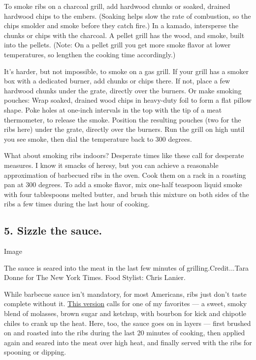 To smoke ribs on a charcoal grill, add hardwood chunks or soaked,
drained hardwood chips to the embers. (Soaking helps slow the rate of
combustion, so the chips smolder and smoke before they catch fire.) In a
kamado, intersperse the chunks or chips with the charcoal. A pellet
grill has the wood, and smoke, built into the pellets. (Note: On a
pellet grill you get more smoke flavor at lower temperatures, so
lengthen the cooking time accordingly.)

It's harder, but not impossible, to smoke on a gas grill. If your grill
has a smoker box with a dedicated burner, add chunks or chips there. If
not, place a few hardwood chunks under the grate, directly over the
burners. Or make smoking pouches: Wrap soaked, drained wood chips in
heavy-duty foil to form a flat pillow shape. Poke holes at one-inch
intervals in the top with the tip of a meat thermometer, to release the
smoke. Position the resulting pouches (two for the ribs here) under the
grate, directly over the burners. Run the grill on high until you see
smoke, then dial the temperature back to 300 degrees.

What about smoking ribs indoors? Desperate times like these call for
desperate measures. I know it smacks of heresy, but you can achieve a
reasonable approximation of barbecued ribs in the oven. Cook them on a
rack in a roasting pan at 300 degrees. To add a smoke flavor, mix
one-half teaspoon liquid smoke with four tablespoons melted butter, and
brush this mixture on both sides of the ribs a few times during the last
hour of cooking.

\hypertarget{5-sizzle-the-sauce}{%
\subsection{5. Sizzle the sauce.}\label{5-sizzle-the-sauce}}

Image

The sauce is seared into the meat in the last few minutes of
grilling.Credit...Tara Donne for The New York Times. Food Stylist: Chris
Lanier.

While barbecue sauce isn't mandatory, for most Americans, ribs just
don't taste complete without it.
\href{https://cooking.nytimes3xbfgragh.onion/recipes/1021242-spice-rubbed-baby-back-ribs-with-chipotle-bourbon-barbecue-sauce}{This
version} calls for one of my favorites --- a sweet, smoky blend of
molasses, brown sugar and ketchup, with bourbon for kick and chipotle
chiles to crank up the heat. Here, too, the sauce goes on in layers ---
first brushed on and roasted into the ribs during the last 20 minutes of
cooking, then applied again and seared into the meat over high heat, and
finally served with the ribs for spooning or dipping.

